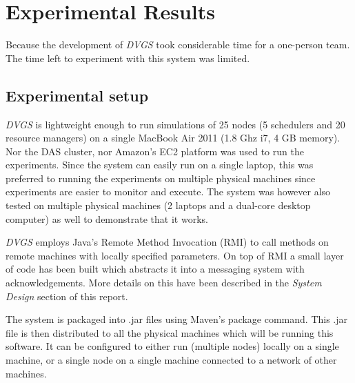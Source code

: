 \documentclass{article}
\begin{document}
\section{Experimental Results}
\label{sec:results}

Because the development of \textit{DVGS} took considerable time for a one-person team. The time left to experiment with this system was limited. 

\subsection{Experimental setup}
\textit{DVGS} is lightweight enough to run simulations of 25 nodes (5 schedulers and 20 resource managers) on a single MacBook Air 2011 (1.8 Ghz i7, 4 GB memory). Nor the DAS cluster, nor Amazon's EC2 platform was used to run the experiments. Since the system can easily run on a single laptop, this was preferred to running the experiments on multiple physical machines since experiments are easier to monitor and execute. The system was however also tested on multiple physical machines (2 laptops and a dual-core desktop computer) as well to demonstrate that it works.

\textit{DVGS} employs Java's Remote Method Invocation (RMI) to call methods on remote machines with locally specified parameters. On top of RMI a small layer of code has been built which abstracts it into a messaging system with acknowledgements. More details on this have been described in the \textit{System Design} section of this report.

The system is packaged into .jar files using Maven's package command. This .jar file is then distributed to all the physical machines which will be running this software. It can be configured to either run (multiple nodes) locally on a single machine, or a single node on a single machine connected to a network of other machines.
\end{document}
